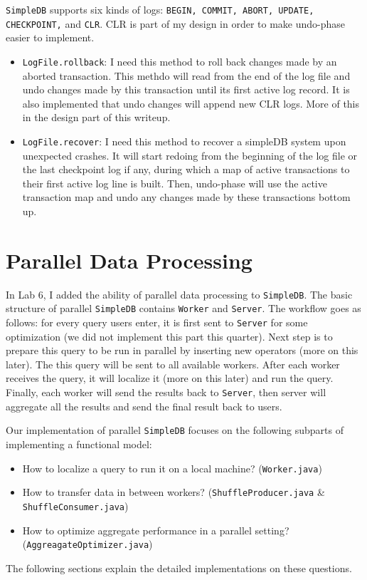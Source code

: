 \documentclass[12pt]{myland}
\def\<#1>{\texttt{#1}}
\begin{document}
    \<SimpleDB> supports six kinds of logs: \<BEGIN, COMMIT, ABORT, UPDATE, CHECKPOINT,> and \<CLR>. CLR is part of my
    design in order to make undo-phase easier to implement.

    \begin{itemize}
        \item \texttt{LogFile.rollback}: I need this method to roll back changes made by an aborted transaction. This
        methdo will read from the end of the log file and undo changes made by this transaction until its first active
        log record. It is also implemented that undo changes will append new CLR logs. More of this in the design part
        of this writeup.

        \item \texttt{LogFile.recover}: I need this method to recover a simpleDB system upon unexpected crashes. It
        will start redoing from the beginning of the log file or the last checkpoint log if any, during which a map of
        active transactions to their first active log line is built. Then, undo-phase will use the active transaction
        map and undo any changes made by these transactions bottom up.
	\end{itemize}

\section{Parallel Data Processing}
	\label{parallel}

    In Lab 6, I added the ability of parallel data processing to \<SimpleDB>. The basic structure of parallel \<SimpleDB>
    contains \<Worker> and \<Server>. The workflow goes as follows: for every query users enter, it is first sent to
    \<Server> for some optimization (we did not implement this part this quarter). Next step is to prepare this query to
    be run in parallel by inserting new operators (more on this later). The this query will be sent to all
    available workers. After each worker receives the query, it will localize it (more on this later) and run the query.
    Finally, each worker will send the results back to \<Server>, then server will aggregate all the results and send
    the final result back to users. \par

    Our implementation of parallel \<SimpleDB> focuses on the following subparts of implementing a functional model:
    \begin{itemize}
        \item How to localize a query to run it on a local machine? (\<Worker.java>)
        \item How to transfer data in between workers? (\<ShuffleProducer.java> \& \<ShuffleConsumer.java>)
        \item How to optimize aggregate performance in a parallel setting? (\<AggreagateOptimizer.java>)
    \end{itemize}
    The following sections explain the detailed implementations on these questions.
\end{document}
